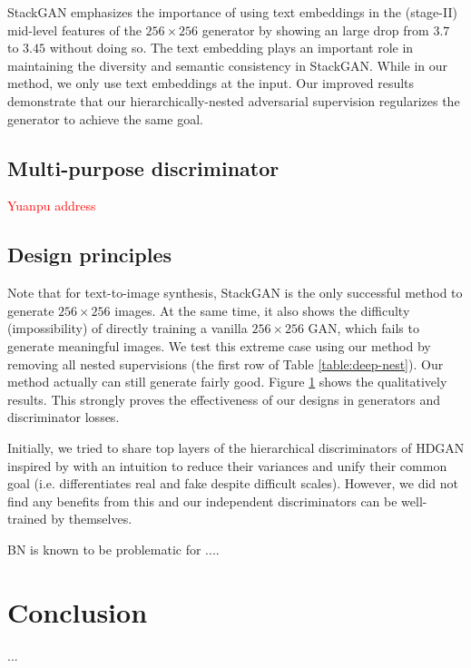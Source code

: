 \documentclass[10pt,twocolumn,letterpaper]{article}
\begin{document}
StackGAN emphasizes the importance of using text embeddings in the (stage-II) mid-level features of the $256{\times}256$ generator by showing an large drop from $3.7$ to $3.45$ without doing so. The text embedding plays an important role in maintaining the diversity and semantic consistency in StackGAN. While in our method, we only use text embeddings at the input. Our improved results demonstrate that our hierarchically-nested adversarial supervision regularizes the generator to achieve the same goal. 


\subsection{Multi-purpose discriminator}
\textcolor{red}{Yuanpu address}

\begin{figure}[t]
	\centering
	\caption{} \label{fig:vallina-res}
\end{figure}


\subsection{Design principles}
Note that for text-to-image synthesis, StackGAN is the only successful method to generate $256{\times}256$ images.
At the same time, it also shows the difficulty (impossibility) of directly training a vanilla $256{\times}256$ GAN, which fails to generate meaningful images. 
We test this extreme case using our method by removing all nested supervisions (the first row of Table \ref{table:deep-nest}). 
Our method actually can still generate fairly good. Figure \ref{fig:vallina-res} shows the qualitatively results. This strongly proves the effectiveness of our designs in generators and discriminator losses.

Initially, we tried to share top layers of the hierarchical discriminators of HDGAN inspired by \cite{liu2017unsupervised} with an intuition to reduce their variances and unify their common goal (i.e. differentiates real and fake despite difficult scales). However, we did not find any benefits from this and our independent discriminators can be well-trained by themselves. 

BN is known to be problematic for .... 



\section{Conclusion}
...

{\small


}
\end{document}

